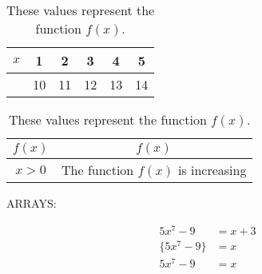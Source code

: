 \documentclass[11]{article}
\begin{document}
\begin{table}[H]
\centering
\def\arraystretch{2}%
\begin{tabular}{|c||c|c|c|c|c|}
\hline
$x$&1&2&3&4&5\\ \hline
&10 &11&12&13&14\\ \hline
\end{tabular}
\caption{These values represent the function $f(x)$.}
\end{table}




\begin{table}[H]
\centering
\def\arraystretch{2}
\begin{tabular}{|c||c|}
\hline
$f(x)$&$f(x)$\\ \hline
$x>0$& The function $f(x)$ is increasing \\ \hline
\end{tabular}
\caption{These values represent the function $f(x)$.}
\end{table}





ARRAYS:

\begin{align}
5x^7-9&=x+3\\
\{5x^7-9\}&=x\\
{5x^7-9}&=x
\end{align}
\end{document}
